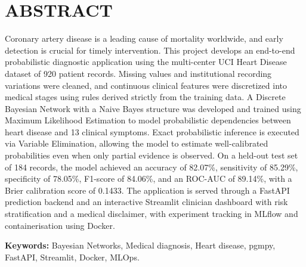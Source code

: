 \chapter*{\centering ABSTRACT}

\noindent Coronary artery disease is a leading cause of mortality worldwide, and early detection is crucial for timely intervention. This project develops an end-to-end probabilistic diagnostic application using the multi-center UCI Heart Disease dataset of 920 patient records. Missing values and institutional recording variations were cleaned, and continuous clinical features were discretized into medical stages using rules derived strictly from the training data. A Discrete Bayesian Network with a Naive Bayes structure was developed and trained using Maximum Likelihood Estimation to model probabilistic dependencies between heart disease and 13 clinical symptoms. Exact probabilistic inference is executed via Variable Elimination, allowing the model to estimate well-calibrated probabilities even when only partial evidence is observed. On a held-out test set of 184 records, the model achieved an accuracy of 82.07\%, sensitivity of 85.29\%, specificity of 78.05\%, F1-score of 84.06\%, and an ROC-AUC of 89.14\%, with a Brier calibration score of 0.1433. The application is served through a FastAPI prediction backend and an interactive Streamlit clinician dashboard with risk stratification and a medical disclaimer, with experiment tracking in MLflow and containerisation using Docker.

\vspace{0.5cm}
\noindent\textbf{Keywords:} Bayesian Networks, Medical diagnosis, Heart disease, pgmpy, FastAPI, Streamlit, Docker, MLOps.
